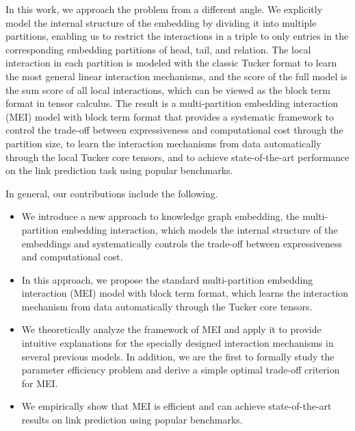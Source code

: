 \documentclass{ecai}
\theoremstyle{plain}  \newtheorem{thm}{Theorem}  \newtheorem{lem}[thm]{Lemma}  \newtheorem{prop}[thm]{Proposition}
\theoremstyle{remark}  \newtheorem*{rem}{Remark}
\begin{document}
In this work, we approach the problem from a different angle. We explicitly model the internal structure of the embedding by dividing it into multiple partitions, enabling us to restrict the interactions in a triple to only entries in the corresponding embedding partitions of head, tail, and relation. The local interaction in each partition is modeled with the classic Tucker format \cite{tucker_mathematicalnotesthreemode_1966} to learn the most general linear interaction mechanisms, and the score of the full model is the sum score of all local interactions, which can be viewed as the block term format \cite{delathauwer_decompositionshigherordertensor_2008a} in tensor calculus. The result is a multi-partition embedding interaction (MEI) model with block term format that provides a systematic framework to control the trade-off between expressiveness and computational cost through the partition size, to learn the interaction mechanisms from data automatically through the local Tucker core tensors, and to achieve state-of-the-art performance on the link prediction task using popular benchmarks.



In general, our contributions include the following.
\begin{itemize}
	\item We introduce a new approach to knowledge graph embedding, the multi-partition embedding interaction, which models the internal structure of the embeddings and systematically controls the trade-off between expressiveness and computational cost.
	
	\item In this approach, we propose the standard multi-partition embedding interaction (MEI) model with block term format, which learns the interaction mechanism from data automatically through the Tucker core tensors.
	
	\item We theoretically analyze the framework of MEI and apply it to provide intuitive explanations for the specially designed interaction mechanisms in several previous models. In addition, we are the first to formally study the parameter efficiency problem and derive a simple optimal trade-off criterion for MEI.
	
	\item We empirically show that MEI is efficient and can achieve state-of-the-art results on link prediction using popular benchmarks.
\end{itemize}
\end{document}
